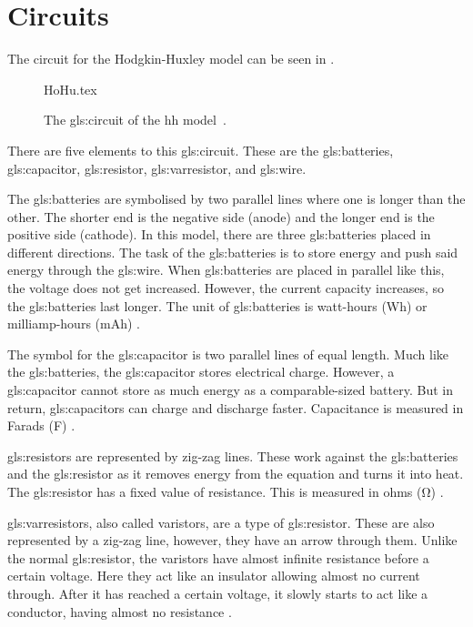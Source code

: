 \documentclass[../../Orator]{subfiles}
\begin{document}
 
 

\section{Circuits}
The circuit for the Hodgkin-Huxley model can be seen in . 

\begin{figure}[ht]
    \centering
    {HoHu.tex}
    \caption{The \gls{gls:circuit} of the \gls{hh} model~\cite{HodHux1952}.}\label{fig:HHcircuit}
\end{figure}
There are five elements to this \gls{gls:circuit}. These are the \gls{gls:batteries}, \gls{gls:capacitor}, \gls{gls:resistor}, \gls{gls:varresistor}, and \gls{gls:wire}. 

The \gls{gls:batteries} are symbolised by two parallel lines where one is longer than the other. The shorter end is the negative side (anode) and the longer end is the positive side (cathode). In this model, there are three \gls{gls:batteries} placed in different directions. The task of the \gls{gls:batteries} is to store energy and push said energy through the \gls{gls:wire}. When \gls{gls:batteries} are placed in parallel like this, the voltage does not get increased. However, the current capacity increases, so the \gls{gls:batteries} last longer. The unit of \gls{gls:batteries} is watt-hours (Wh) or milliamp-hours (mAh) \cite{}. 

The symbol for the \gls{gls:capacitor} is two parallel lines of equal length. Much like the \gls{gls:batteries}, the \gls{gls:capacitor} stores electrical charge. However, a \gls{gls:capacitor} cannot store as much energy as a comparable-sized battery. But in return, \gls{gls:capacitor}s can charge and discharge faster. Capacitance is measured in Farads (\unit{\farad}) \cite{}.

\gls{gls:resistor}s are represented by zig-zag lines. These work against the \gls{gls:batteries} and the \gls{gls:resistor} as it removes energy from the equation and turns it into heat. The \gls{gls:resistor} has a fixed value of resistance. This is measured in ohms (\unit{\ohm}) \cite{}.

\Glspl{gls:varresistor}, also called varistors, are a type of \gls{gls:resistor}. These are also represented by a zig-zag line, however, they have an arrow through them. Unlike the normal \gls{gls:resistor}, the varistors have almost infinite resistance before a certain voltage. Here they act like an insulator allowing almost no current through. After it has reached a certain voltage, it slowly starts to act like a conductor, having almost no resistance \cite{}. 
\end{document}
